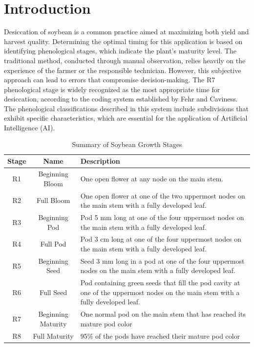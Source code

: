 \documentclass[12pt]{article}
\begin{document}
\section{Introduction} 
Desiccation of soybean is a common practice aimed at maximizing both yield and harvest quality. Determining the optimal timing for this application is based on identifying phenological stages, which indicate the plant's maturity level. The traditional method, conducted through manual observation, relies heavily on the experience of the farmer or the responsible technician. However, this subjective approach can lead to errors that compromise decision-making. The R7 phenological stage is widely recognized as the most appropriate time for desiccation, according to the coding system established by Fehr and Caviness. The phenological classifications described in this system include subdivisions that exhibit specific characteristics, which are essential for the application of Artificial Intelligence (AI). 
\begin{table}[!h]
\renewcommand{\arraystretch}{1.3}
\caption{Summary of Soybean Growth Stages}
\label{table:soybean_stages}
\centering
\begin{tabular}{|c|c|p{5.5cm}|}
\hline
\textbf{Stage} & \textbf{Name} & \textbf{Description} \\
\hline
R1 & Beginning Bloom & One open flower at any node on the main stem. \\
\hline
R2 & Full Bloom & One open flower at one of the two uppermost nodes on the main stem with a fully developed leaf. \\
\hline
R3 & Beginning Pod & Pod 5 mm long at one of the four uppermost nodes on the main stem with a fully developed leaf. \\
\hline
R4 & Full Pod & Pod 3 cm long at one of the four uppermost nodes on the main stem with a fully developed leaf. \\
\hline
R5 & Beginning Seed & Seed 3 mm long in a pod at one of the four uppermost nodes on the main stem with a fully developed leaf. \\
\hline
R6 & Full Seed & Pod containing green seeds that fill the pod cavity at one of the uppermost nodes on the main stem with a fully developed leaf. \\
\hline
R7 & Beginning Maturity & One normal pod on the main stem that has reached its mature pod color \\
\hline
R8 & Full Maturity  & 95\% of the pods have reached their mature pod color \\
\hline
\end{tabular}
\end{table}
\end{document}
